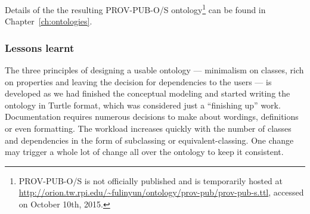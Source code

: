 Details of the the resulting PROV-PUB-O/S ontology\footnote{PROV-PUB-O/S is not officially published and is temporarily hosted at \url{http://orion.tw.rpi.edu/~fulinyun/ontology/prov-pub/prov-pub-s.ttl}, accessed on October 10th, 2015.} can be found in Chapter~\ref{ch:ontologies}.


\subsubsection{Lessons learnt}
The three principles of designing a usable ontology --- minimalism on classes, rich on properties and leaving the decision for dependencies to the users --- is developed as we had finished the conceptual modeling and started writing the ontology in Turtle format, which was considered just a ``finishing up'' work. Documentation requires numerous decisions to make about wordings, definitions or even formatting. The workload increases quickly with the number of classes and dependencies in the form of subclassing or equivalent-classing. One change may trigger a whole lot of change all over the ontology to keep it consistent.

